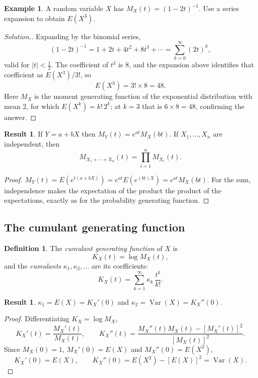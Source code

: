 \documentclass[11pt,a4paper]{article}
\theoremstyle{definition}
\newtheorem{defn}[thm]{Definition}
\newtheorem{exa}[thm]{Example}
\newtheorem{result}[thm]{Result}
\newenvironment{solution}
  {\renewcommand{\qedsymbol}{}\begin{proof}[\textit{Solution}.]}
  {\end{proof}}
\DeclareMathOperator{\Var}{Var}
\begin{document}
\begin{exa}
A random variable $X$ has $M_X(t) = (1-2t)^{-1}$. Use a series expansion to
obtain $E\left(X^{3}\right)$.
\end{exa}

\begin{solution}
Expanding by the binomial series,
$$(1-2t)^{-1} = 1 + 2t + 4t^{2} + 8t^{3} + \cdots = \sum_{k=0}^{\infty}(2t)^{k},$$
valid for $\left|t\right|<\tfrac12$. The coefficient of $t^{3}$ is $8$, and the
expansion above identifies that coefficient as $E\left(X^{3}\right)/3!$, so
$$E\left(X^{3}\right) = 3!\times 8 = 48 .$$
Here $M_X$ is the moment generating function of the exponential distribution
with mean $2$, for which $E\left(X^{k}\right)=k!\,2^{k}$; at $k=3$ that is
$6\times 8 = 48$, confirming the answer.
\end{solution}

\begin{result}
If $Y = a+bX$ then $M_Y(t) = e^{at}M_X(bt)$. If $X_1,\dots,X_n$ are
independent, then
$$M_{X_1+\cdots+X_n}(t) = \prod_{i=1}^{n}M_{X_i}(t).$$
\end{result}

\begin{proof}
$M_Y(t)=E\left(e^{t(a+bX)}\right)=e^{at}E\left(e^{(bt)X}\right)=e^{at}M_X(bt)$.
For the sum, independence makes the expectation of the product the product of
the expectations, exactly as for the probability generating function.
\end{proof}

\subsection{The cumulant generating function}

\begin{defn}
The \emph{cumulant generating function} of $X$ is
$$K_X(t) = \log M_X(t),$$
and the \emph{cumulants} $\kappa_1,\kappa_2,\dots$ are its coefficients:
$$K_X(t) = \sum_{k=1}^{\infty}\kappa_k\,\frac{t^{k}}{k!} .$$
\end{defn}

\begin{result}
$\kappa_1 = E(X) = K_X'(0)$ and $\kappa_2 = \Var(X) = K_X''(0)$.
\end{result}

\begin{proof}
Differentiating $K_X = \log M_X$,
$$K_X'(t) = \frac{M_X'(t)}{M_X(t)},\qquad
K_X''(t) = \frac{M_X''(t)M_X(t) - \left[M_X'(t)\right]^{2}}{\left[M_X(t)\right]^{2}} .$$
Since $M_X(0)=1$, $M_X'(0)=E(X)$ and $M_X''(0)=E\left(X^{2}\right)$,
$$K_X'(0) = E(X),\qquad
K_X''(0) = E\left(X^{2}\right) - \left[E(X)\right]^{2} = \Var(X).$$
\end{proof}
\end{document}
